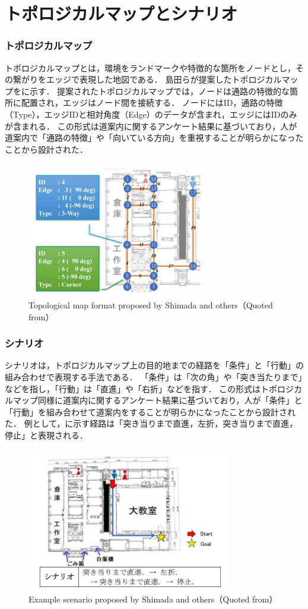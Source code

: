 \section{トポロジカルマップとシナリオ}
\subsubsection{トポロジカルマップ}
トポロジカルマップとは，環境をランドマークや特徴的な箇所をノードとし，その繋がりをエッジで表現した地図である．
島田らが提案したトポロジカルマップをに示す．
提案されたトポロジカルマップでは，ノードは通路の特徴的な箇所に配置され，エッジはノード間を接続する．
ノードにはID，通路の特徴（Type），エッジIDと相対角度（Edge）のデータが含まれ，エッジにはIDのみが含まれる．
この形式は道案内に関するアンケート結果に基づいており，人が道案内で「通路の特徴」や「向いている方向」を重視することが明らかになったことから設計された．

\begin{figure}[htbp]
  \centering
   \includegraphics[width=80mm]{images/pdf/shimada/topo.pdf}
   \caption{Topological map format proposed by Shimada and others（Quoted from\cite{shimada2020}）}
   \label{fig:shimada_topo}
\end{figure}

\clearpage
\subsubsection{シナリオ}
シナリオは，トポロジカルマップ上の目的地までの経路を「条件」と「行動」の組み合わせで表現する手法である．
「条件」は「次の角」や「突き当たりまで」などを指し，「行動」は「直進」や「右折」などを指す．
この形式はトポロジカルマップ同様に道案内に関するアンケート結果に基づいており，人が「条件」と「行動」を組み合わせて道案内をすることが明らかになったことから設計された．
例として，に示す経路は「突き当りまで直進，左折，突き当りまで直進，停止」と表現される．

\begin{figure}[htbp]
  \centering
   \includegraphics[width=90mm]{images/pdf/shimada/scenario.pdf}
   \caption{Example scenario proposed by Shimada and others（Quoted from\cite{shimada2020}）}
   \label{fig:shimada_scenario}
\end{figure}